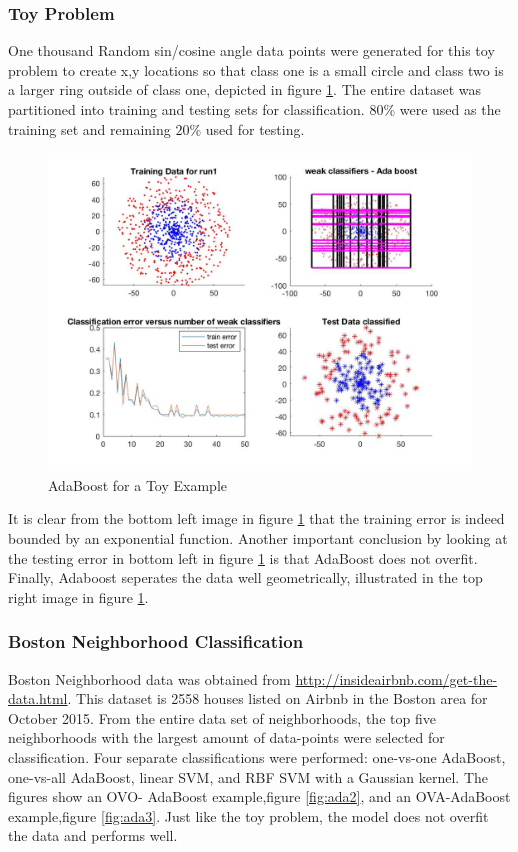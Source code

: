 \documentclass[10pt,twocolumn,letterpaper]{article}
\begin{document}
\subsubsection{Toy Problem}
One thousand Random sin/cosine angle data points were generated for this toy problem to create x,y locations so that class one is a small circle and class two is a larger ring outside of class one, depicted in figure \ref{fig:ada1}. The entire dataset was partitioned into training and testing sets for classification. $80\%$ were used as the training set and remaining $20\%$ used for testing. 
\begin{figure}[h!]
  \includegraphics[width=\linewidth]{ada_fig1.jpg}
  \caption{AdaBoost for a Toy Example}
  \label{fig:ada1}
\end{figure}

\indent It is clear from the bottom left image in figure \ref{fig:ada1} that the training error is indeed bounded by an exponential function. Another important conclusion by looking at the testing error in bottom left in figure \ref{fig:ada1} is that AdaBoost does not overfit.  Finally,  Adaboost seperates the data well geometrically, illustrated in the top right image in figure \ref{fig:ada1}.

\subsubsection{Boston Neighborhood Classification}

Boston Neighborhood data was obtained from
\url{http://insideairbnb.com/get-the-data.html}. This dataset is 2558 houses listed on Airbnb in the Boston area for October 2015. From the entire data set of neighborhoods, the top five neighborhoods with the largest amount of data-points were selected for classification.  Four separate classifications were performed: one-vs-one AdaBoost, one-vs-all AdaBoost, linear SVM, and RBF SVM with a Gaussian kernel.  The figures show an OVO- AdaBoost example,figure \ref{fig:ada2}, and an OVA-AdaBoost example,figure \ref{fig:ada3}. Just like the toy problem, the model does not overfit the data and performs well. 
\end{document}
